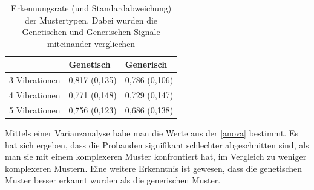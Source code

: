 \begin{table}[]
\centering
\caption{Erkennungsrate (und Standardabweichung) der Mustertypen. Dabei wurden die Genetischen und Generischen Signale miteinander vergliechen}
\label{anova}
\begin{tabular}{l|ll}
              & Genetisch     & Generisch     \\ \hline
3 Vibrationen & 0,817 (0,135) & 0,786 (0,106) \\
4 Vibrationen & 0,771 (0,148) & 0,729 (0,147) \\
5 Vibrationen & 0,756 (0,123) & 0,686 (0,138)
\end{tabular}
\end{table}

Mittels einer Varianzanalyse habe man die Werte aus der \autoref{anova} bestimmt. 
Es hat sich ergeben, dass die Probanden signifikant schlechter abgeschnitten sind, als man sie mit einem komplexeren Muster konfrontiert hat, im Vergleich zu weniger komplexeren Mustern. 
Eine weitere Erkenntnis ist gewesen, dass die genetischen Muster besser erkannt wurden als die generischen Muster.














